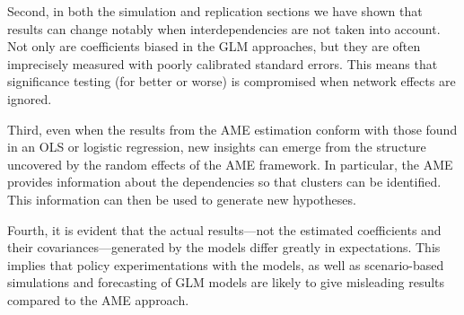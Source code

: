 Second, in both the simulation  and replication sections  we have shown that results can change notably when interdependencies are not taken into account. Not only are coefficients biased in the GLM approaches, but they are often imprecisely measured with poorly calibrated standard errors.  This means that significance testing (for better or worse) is compromised when network effects are ignored.

Third, even when the results from the AME estimation conform with those found in an OLS or logistic regression, new insights can emerge from the structure uncovered by the random effects of the AME framework. In particular, the AME provides information about the dependencies so that clusters can be identified.  This information can then be used to generate new hypotheses. 

Fourth, it is evident that the actual results---not the estimated coefficients and their covariances---generated by the models differ greatly in expectations.  This implies that policy experimentations with the models, as well as scenario-based simulations and forecasting of GLM models are likely to give misleading results compared to the AME approach.
